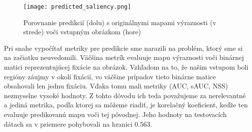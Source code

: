 \begin{figure}[H]
	\begin{center}
		\texttt{[image: predicted\_saliency.png]}
		\caption[Porovnanie prvotných výsledkov]{
			Porovnanie predikcií (dolu) s originálnymi mapami výraznosti (v strede) voči vstupným obrázkom (hore)
		}\label{results_image}
	\end{center}
\end{figure}

Pri snahe vypočítať metriky pre predikcie sme narazili na problém, ktorý sme si na začiatku neuvedomili. Väčšina metrík evaluuje mapu výraznosti voči binárnej matici reprezentujúcej fixácie na obrázok. Vzhľadom na to, že našim vstupom boli regióny záujmy v okolí fixácií, vo väčšine prípadov tieto binárne matice obsahovali len jednu fixáciu. Vďaka tomu mali metriky (AUC, sAUC, NSS) nezmyselne vysoké hodnoty. Z tohto dôvodu ich teda považujeme za nerelevantné a jediná metrika, podľa ktorej sa môžeme riadiť, je korelačný koeficient, keďže ten evaluuje predikovanú mapu voči tej pôvodnej. Jeho hodnoty na testovacích dátach sa v priemere pohybovali na hranici 0.563.